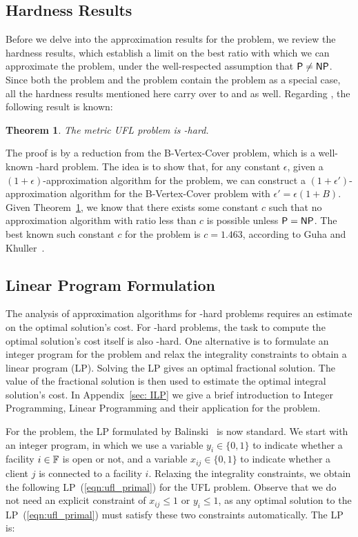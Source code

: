 \documentclass[oneside,final]{ucr}
\newtheorem{theorem}{Theorem}
\begin{document}
\subsection{Hardness Results}
Before we delve into the approximation results for the
{\UFL} problem, we review the hardness results, which
establish a limit on the best ratio with which we can
approximate the {\UFL} problem, under the well-respected
assumption that ${\mbox{\sf P}} \neq {\mbox{\sf NP}}$. Since both the {\FTFL}
problem and the {\FTFP} problem contain the {\UFL} problem
as a special case, all the hardness results mentioned here
carry over to {\FTFL} and {\FTFP} as well. Regarding {\UFL},
the following result is known:
\begin{theorem}\cite{GuhaK98}
  \label{thm:maxsnp}
  The metric UFL problem is \MaxSNP-hard.
\end{theorem}
The proof is by a reduction from the B-Vertex-Cover problem,
which is a well-known \MaxSNP-hard problem. The idea is to
show that, for any constant $\epsilon$, given a
$(1+\epsilon)$-approximation algorithm for the {\UFL}
problem, we can construct a $(1+\epsilon')$-approximation
algorithm for the B-Vertex-Cover problem with $\epsilon' =
\epsilon(1+B)$. Given Theorem~\ref{thm:maxsnp}, we know that
there exists some constant $c$ such that no approximation
algorithm with ratio less than $c$ is possible unless ${\mbox{\sf P}} =
{\mbox{\sf NP}}$. The best known such constant $c$ for the {\UFL}
problem is $c=1.463$, according to Guha and
Khuller~\cite{GuhaK98}.

\subsection{Linear Program Formulation}
The analysis of approximation algorithms for \NP-hard
problems requires an estimate on the optimal solution's
cost. For \NP-hard problems, the task to compute the optimal
solution's cost itself is also \NP-hard. One alternative is
to formulate an integer program for the problem and relax
the integrality constraints to obtain a linear program
(LP). Solving the LP gives an optimal fractional
solution. The value of the fractional solution is then used
to estimate the optimal integral solution's cost. In
Appendix~\ref{sec: ILP} we give a brief introduction to
Integer Programming, Linear Programming and their
application for the {\UFL} problem.

For the {\UFL} problem, the LP formulated by
Balinski~\cite{Bal66} is now standard. We start with an
integer program, in which we use a variable $y_i\in \{0,1\}$
to indicate whether a facility $i\in\mathbb{F}$ is open or
not, and a variable $x_{ij} \in \{0,1\}$ to indicate whether
a client $j$ is connected to a facility $i$. Relaxing the
integrality constraints, we obtain the following
LP~(\ref{eqn:ufl_primal}) for the UFL problem. Observe that
we do not need an explicit constraint of $x_{ij} \leq 1$ or
$y_i \leq 1$, as any optimal solution to the
LP~(\ref{eqn:ufl_primal}) must satisfy these two constraints
automatically. The LP is:
\end{document}
